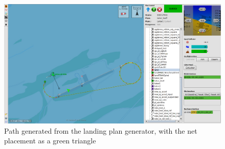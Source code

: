 \begin{figure}
\centering
\includegraphics[scale=0.25]{figs/LandingPathNeptus.png}
\caption{Path generated from the landing plan generator, with the net placement as a green triangle}
\label{Fig:LandingPathNeptus}
\end{figure}

